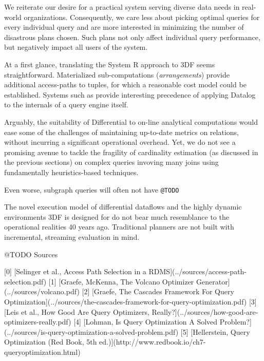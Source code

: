 \documentclass[../index.tex]{subfiles}
\begin{document}
We reiterate our desire for a practical system serving diverse data
needs in real-world organizations. Consequently, we care less about
picking optimal queries for every individual query and are more
interested in minimizing the number of disastrous plans chosen. Such
plans not only affect individual query performance, but negatively
impact all users of the system.

At a first glance, translating the System R approach to 3DF seems
straightforward. Materialized sub-computations (\emph{arrangements})
provide additional access-paths to tuples, for which a reasonable cost
model could be established. Systems such as \cite{condie2008evita}
provide interesting precedence of applying Datalog to the internals of
a query engine itself.

Arguably, the suitability of Differential to on-line analytical
computations would ease some of the challenges of maintaining
up-to-date metrics on relations, without incurring a significant
operational overhead. Yet, we do not see a promising avenue to tackle
the fragility of cardinality estimation (as discussed in the previous
sections) on complex queries invoving many joins using fundamentally
heuristics-based techniques.

Even worse, subgraph queries will often not have \texttt{@TODO}

The novel execution model of differential dataflows and the highly
dynamic environments 3DF is designed for do not bear much resemblance
to the operational realities 40 years ago. Traditional planners are
not built with incremental, streaming evaluation in mind.

@TODO Sources

[0] [Selinger et al., Access Path Selection in a RDMS](../sources/access-path-selection.pdf)
[1] [Graefe, McKenna, The Volcano Optimizer Generator](../sources/volcano.pdf)
[2] [Graefe, The Cascades Framework For Query Optimization](../sources/the-cascades-framework-for-query-optimization.pdf)
[3] [Leis et al., How Good Are Query Optimizers, Really?](../sources/how-good-are-optimizers-really.pdf)
[4] [Lohman, Is Query Optimization A Solved Problem?](../sources/is-query-optimization-a-solved-problem.pdf)
[5] [Hellerstein, Query Optimization (Red Book, 5th ed.)](http://www.redbook.io/ch7-queryoptimization.html)
\end{document}
